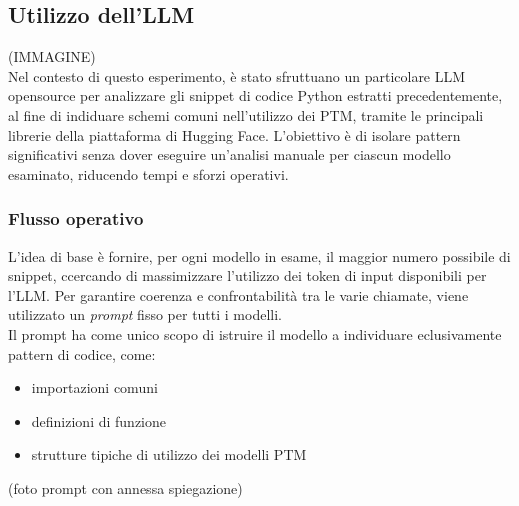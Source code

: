 \documentclass{article}
\begin{document}
\begin{itemize}
\subsection{Utilizzo dell'LLM}
(IMMAGINE)\\
Nel contesto di questo esperimento, è stato sfruttuano un particolare LLM opensource per analizzare gli snippet di codice Python estratti precedentemente, al fine di indiduare schemi comuni nell'utilizzo dei PTM, tramite le principali librerie della piattaforma di Hugging Face.
L'obiettivo è di isolare pattern significativi senza dover eseguire un'analisi manuale per ciascun modello esaminato, riducendo tempi e sforzi operativi.

\subsubsection{Flusso operativo}
L'idea di base è fornire, per ogni modello in esame, il maggior numero possibile di snippet, ccercando di massimizzare l’utilizzo dei token di input disponibili per l’LLM. Per garantire coerenza e confrontabilità tra le varie chiamate, viene utilizzato un \textit{prompt} fisso per tutti i modelli. \\
Il prompt ha come unico scopo di istruire il modello a individuare eclusivamente pattern di codice, come:
\begin{itemize}
    \item importazioni comuni
    \item definizioni di funzione
    \item strutture tipiche di utilizzo dei modelli PTM
\end{itemize}

(foto prompt con annessa spiegazione)


\end{itemize}
\end{document}
